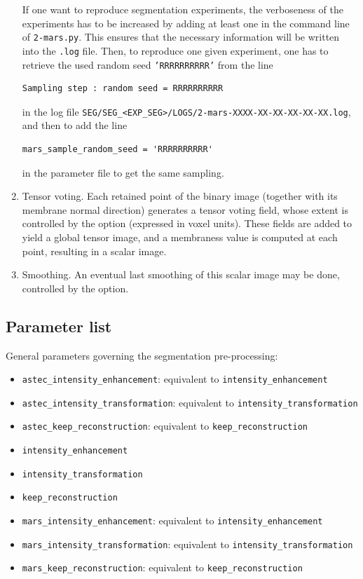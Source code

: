 \begin{enumerate}
If one want to reproduce segmentation experiments, 
the verboseness of the experiments has to be increased by adding at least one  in the command line of \texttt{2-mars.py}. This ensures that the necessary information will be written into the \texttt{.log} file.
Then, to reproduce one given experiment, one has to retrieve the used random seed \texttt{'RRRRRRRRRR'} from the line 
\begin{verbatim}
Sampling step : random seed = RRRRRRRRRR
\end{verbatim}
in the log file 
\texttt{SEG/SEG\_<EXP\_SEG>/LOGS/2-mars-XXXX-XX-XX-XX-XX-XX.log}, and then to add the line
\begin{verbatim}
mars_sample_random_seed = 'RRRRRRRRRR'
\end{verbatim}
in the parameter file to get the same sampling.


\item \label{it:gace:tensorvoting} Tensor voting.
Each retained point of the binary image (together with its membrane normal direction) generates a tensor voting field, whose extent is controlled by the  option (expressed in voxel units). These fields are added to yield a global tensor image, and a membraness value is computed at each point, resulting in a scalar image.

\item Smoothing. An eventual last smoothing of this scalar image may be done, controlled by the  option.
\end{enumerate}





\subsection{Parameter list}

General parameters governing the segmentation pre-processing:
\begin{itemize}
\itemsep -0.5ex
\item \texttt{astec\_intensity\_enhancement}: equivalent to
      \texttt{intensity\_enhancement}
\item \texttt{astec\_intensity\_transformation}: equivalent to
      \texttt{intensity\_transformation}
\item \texttt{astec\_keep\_reconstruction}: equivalent to
      \texttt{keep\_reconstruction}
\item \texttt{intensity\_enhancement}
\item \texttt{intensity\_transformation}
\item \texttt{keep\_reconstruction}
\item \texttt{mars\_intensity\_enhancement}: equivalent to
      \texttt{intensity\_enhancement}
\item \texttt{mars\_intensity\_transformation}: equivalent to
      \texttt{intensity\_transformation}
\item \texttt{mars\_keep\_reconstruction}: equivalent to
      \texttt{keep\_reconstruction}
\end{itemize}

